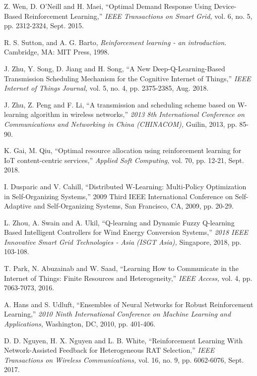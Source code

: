 \documentclass[journal]{IEEEtran}
\begin{document}
\begin{thebibliography}{1}
Z. Wen, D. O'Neill and H. Maei, ``Optimal Demand Response Using Device-Based Reinforcement Learning,'' \emph{IEEE Transactions on Smart Grid,} vol. 6, no. 5, pp. 2312-2324, Sept. 2015.

R. S. Sutton, and A. G. Barto, \emph{Reinforcement learning - an introduction.} Cambridge, MA: MIT Press, 1998.

J. Zhu, Y. Song, D. Jiang and H. Song, ``A New Deep-Q-Learning-Based Transmission Scheduling Mechanism for the Cognitive Internet of Things,'' \emph{IEEE Internet of Things Journal,} vol. 5, no. 4, pp. 2375-2385, Aug. 2018.

J. Zhu, Z. Peng and F. Li, ``A transmission and scheduling scheme based on W-learning algorithm in wireless networks,'' \emph{2013 8th International Conference on Communications and Networking in China (CHINACOM),} Guilin, 2013, pp. 85-90.

K. Gai, M. Qiu, ``Optimal resource allocation using reinforcement learning for IoT content-centric services,'' \emph{Applied Soft Computing,} vol. 70,
pp. 12-21, Sept. 2018.

I. Dusparic and V. Cahill, ``Distributed W-Learning: Multi-Policy Optimization in Self-Organizing Systems,'' 2009 Third IEEE International Conference on Self-Adaptive and Self-Organizing Systems, San Francisco, CA, 2009, pp. 20-29.

L. Zhou, A. Swain and A. Ukil, ``Q-learning and Dynamic Fuzzy Q-learning Based Intelligent Controllers for Wind Energy Conversion Systems,'' \emph{2018 IEEE Innovative Smart Grid Technologies - Asia (ISGT Asia),} Singapore, 2018, pp. 103-108.

T. Park, N. Abuzainab and W. Saad, ``Learning How to Communicate in the Internet of Things: Finite Resources and Heterogeneity,'' \emph{IEEE Access,} vol. 4, pp. 7063-7073, 2016.

A. Hans and S. Udluft, ``Ensembles of Neural Networks for Robust Reinforcement Learning,'' \emph{2010 Ninth International Conference on Machine Learning and Applications,} Washington, DC, 2010, pp. 401-406.

D. D. Nguyen, H. X. Nguyen and L. B. White, ``Reinforcement Learning With Network-Assisted Feedback for Heterogeneous RAT Selection,'' \emph{IEEE Transactions on Wireless Communications,} vol. 16, no. 9, pp. 6062-6076, Sept. 2017.


\end{thebibliography}
\end{document}
